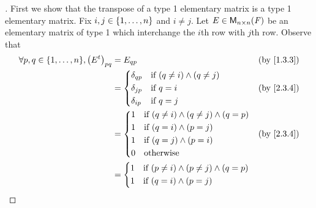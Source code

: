 \begin{proof}[]
	First we show that the transpose of a type 1 elementary matrix is a type 1 elementary matrix.
	Fix \(i, j \in \left\lbrace1, \dots, n\right\rbrace\) and \(i \neq j\).
	Let \(E \in \ms[n][n][\F]\) be an elementary matrix of type 1 which interchange the \(i\)th row with \(j\)th row.
	Observe that
	\begin{align*}
		\forall p, q \in \set{1, \dots, n}, \pa{\tp{E}}_{p q} & = E_{q p}                                                   &  & \by{1.3.3} \\
		                                                      & = \begin{dcases}
			                                                          \delta_{q p} & \text{if } (q \neq i) \land (q \neq j) \\
			                                                          \delta_{j p} & \text{if } q = i                       \\
			                                                          \delta_{i p} & \text{if } q = j
		                                                          \end{dcases}    &  & \by{2.3.4}                     \\
		                                                      & = \begin{dcases}
			                                                          1 & \text{if } (q \neq i) \land (q \neq j) \land (q = p) \\
			                                                          1 & \text{if } (q = i) \land (p = j)                     \\
			                                                          1 & \text{if } (q = j) \land (p = i)                     \\
			                                                          0 & \text{otherwise}
		                                                          \end{dcases} &  & \by{2.3.4}                  \\
		                                                      & = \begin{dcases}
			                                                          1 & \text{if } (p \neq i) \land (p \neq j) \land (q = p) \\
			                                                          1 & \text{if } (q = i) \land (p = j)                     \\

\end{dcases}
\end{align*}
\end{proof}
